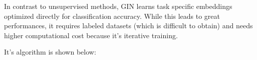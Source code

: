 In contrast to unsupervised methods, GIN learns task specific embeddings optimized directly for classification accuracy. 
While this leads to great performances, it requires labeled datasets (which is difficult to obtain) 
and needs higher computational cost because it's iterative training.

It's algorithm is shown below:





